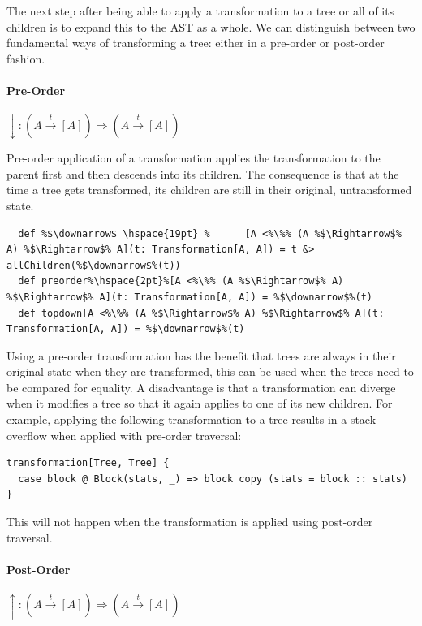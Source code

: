 The next step after being able to apply a transformation to a tree or all of its children is to expand this to the AST as a whole. We can distinguish between two fundamental ways of transforming a tree: either in a pre-order or post-order fashion.

\paragraph{Pre-Order} \hfill $\downarrow: (A \overset{t}{\rightarrow} [A]) \Rightarrow (A \overset{t}{\rightarrow} [A])$

\vspace{7pt} Pre-order application of a transformation applies the transformation to the parent first and then descends into its children. The consequence is that at the time a tree gets transformed, its children are still in their original, untransformed state.

\begin{lstlisting}
  def %$\downarrow$ \hspace{19pt} %      [A <%\%% (A %$\Rightarrow$% A) %$\Rightarrow$% A](t: Transformation[A, A]) = t &> allChildren(%$\downarrow$%(t))
  def preorder%\hspace{2pt}%[A <%\%% (A %$\Rightarrow$% A) %$\Rightarrow$% A](t: Transformation[A, A]) = %$\downarrow$%(t)
  def topdown[A <%\%% (A %$\Rightarrow$% A) %$\Rightarrow$% A](t: Transformation[A, A]) = %$\downarrow$%(t)
\end{lstlisting}

Using a pre-order transformation has the benefit that trees are always in their original state when they are transformed, this can be used when the trees need to be compared for equality. A disadvantage is that a transformation can diverge when it modifies a tree so that it again applies to one of its new children. For example, applying the following transformation to a tree results in a stack overflow when applied with pre-order traversal:

\begin{lstlisting}
transformation[Tree, Tree] {
  case block @ Block(stats, _) => block copy (stats = block :: stats)
}
\end{lstlisting}

This will not happen when the transformation is applied using post-order traversal.

\paragraph{Post-Order} \hfill $\uparrow: (A \overset{t}{\rightarrow} [A]) \Rightarrow (A \overset{t}{\rightarrow} [A])$

